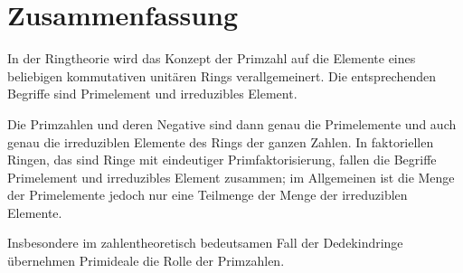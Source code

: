 \chapter{Zusammenfassung}
In der Ringtheorie wird das Konzept der Primzahl auf die Elemente eines beliebigen kommutativen unitären Rings verallgemeinert. Die entsprechenden Begriffe sind Primelement und irreduzibles Element.

Die Primzahlen und deren Negative sind dann genau die Primelemente und auch genau die irreduziblen Elemente des Rings der ganzen Zahlen. In faktoriellen Ringen, das sind Ringe mit eindeutiger Primfaktorisierung, fallen die Begriffe Primelement und irreduzibles Element zusammen; im Allgemeinen ist die Menge der Primelemente jedoch nur eine Teilmenge der Menge der irreduziblen Elemente.

Insbesondere im zahlentheoretisch bedeutsamen Fall der Dedekindringe übernehmen Primideale die Rolle der Primzahlen.
